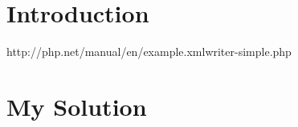 \documentclass[10pt, a4paper]{article}
\begin{document}
\section*{Introduction}
http://php.net/manual/en/example.xmlwriter-simple.php
\section*{My Solution}
\end{document}
